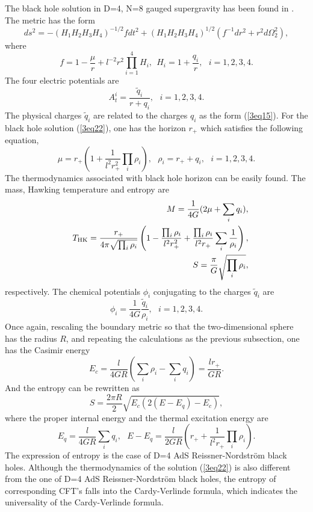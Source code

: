 \documentclass[a4paper,12pt]{article}
\begin{document}
The black hole solution in D=4, N=8 gauged supergravity has been found in
\cite{Duff}. The metric has the form
\begin{equation}
\label{3eq22}
ds^2 = -(H_1H_2H_3H_4)^{-1/2} fdt^2 +(H_1H_2H_3H_4)^{1/2}(f^{-1}dr^2
   +r^2 d\Omega_2^2),
\end{equation}
where
\begin{equation}
f = 1-\frac{\mu}{r} +l^{-2}r^2 \prod_{i=1}^4H_i,  \ \  H_i =1+\frac{q_i}{r},
\ \ \ i=1, 2, 3, 4.
\end{equation}
The four electric potentials are
\begin{equation}
A^i _t = \frac{\tilde q_i}{r +q_i}, \ \ \  i=1, 2, 3, 4.
\end{equation}
The physical charges $\tilde q_i$ are related to the charges $q_i$ as the form
(\ref{3eq15}). For the black hole solution (\ref{3eq22}), one has the
horizon $r_+$ which satisfies the following equation,
\begin{equation}
\mu = r_+\left( 1+\frac{1}{l^2 r_+^2} \prod_i \rho_i \right), \ \ \ \rho_i =
  r_+ +q_i, \ \ \ i=1, 2, 3, 4.
\end{equation}
The thermodynamics associated with black hole horizon can be easily found.
The mass, Hawking temperature and entropy are
\begin{eqnarray}
&& M = \frac{1}{4G}(2\mu + \sum_i q_i), \nonumber \\
&& T_{\rm HK} =\frac{r_+}{4\pi \sqrt{\prod_i \rho_i}}\left ( 1-\frac{\prod_i 
   \rho_i}{l^2 r_+^2}+ \frac{\prod_i \rho_i}{l^2 r_+}\sum_i \frac{1}{\rho_i}
    \right), \nonumber \\
&& S =\frac{\pi}{G}\sqrt{\prod_i \rho_i}, 
\end{eqnarray}
respectively.  The chemical potentials $\phi_i$ conjugating to the 
charges $\tilde q_i$ are 
\begin{equation}
\phi _i = \frac{1}{4G}\frac{\tilde q_i}{\rho_i}, \ \ \  i=1, 2, 3, 4.
\end{equation}
Once again, rescaling the boundary metric so that the two-dimensional
sphere has the radius $R$, and repeating the calculations as the
previous subsection, one has the Casimir energy
\begin{equation}
E_c= \frac{l}{4 GR}( \sum_i \rho_i-\sum_i q_i) =\frac{lr_+}{GR}.
\end{equation}
And the entropy can be rewritten as 
\begin{equation}
\label{3eq29}
S =\frac{2\pi R}{2}
   \sqrt{E_c(2(E-E_q)-E_c)}, 
\end{equation}
where the proper internal energy and the thermal excitation energy are
\begin{equation}
E_q=\frac{l}{4GR}\sum_iq_i, \ \ \  E-E_q=\frac{l}{2GR}\left(r_+ 
     +\frac{1}{l^2r_+} \prod_i \rho_i\right).
\end{equation} 
The expression of entropy is the case of D=4 AdS Reissner-Nordstr\"om
black holes.  Although the thermodynamics of the solution (\ref{3eq22}) is
also different from the one of D=4 AdS Reissner-Nordstr\"om black 
holes, the entropy of corresponding CFT's falls into the Cardy-Verlinde 
formula, which indicates the universality of the Cardy-Verlinde formula.  
\end{document}
